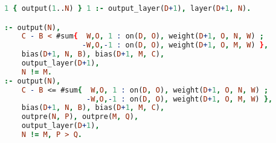 \begin{code}
\begin{lstlisting}[language=Prolog, numbers=none]
1 { output(1..N) } 1 :- output_layer(D+1), layer(D+1, N).

:- output(N),
    C - B < #sum{  W,O, 1 : on(D, O), weight(D+1, O, N, W) ;
                  -W,O,-1 : on(D, O), weight(D+1, O, M, W) },
    bias(D+1, N, B), bias(D+1, M, C),
    output_layer(D+1),
    N != M.
:- output(N),
    C - B <= #sum{  W,O, 1 : on(D, O), weight(D+1, O, N, W) ;
                   -W,O,-1 : on(D, O), weight(D+1, O, M, W) },
    bias(D+1, N, B), bias(D+1, M, C),
    outpre(N, P), outpre(M, Q),
    output_layer(D+1),
    N != M, P > Q.
\end{lstlisting}
    \nobreak{}\label{enc:argmax_direct}
\end{code}

